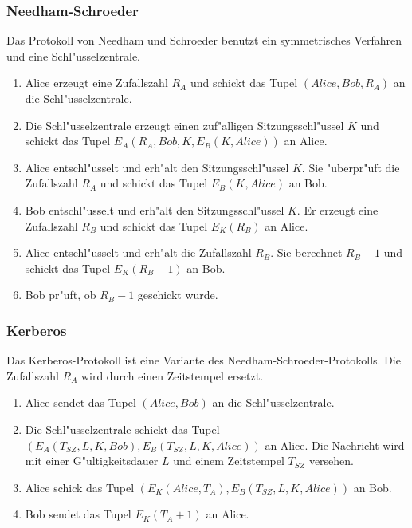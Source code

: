 
\subsubsection*{Needham-Schroeder}

Das Protokoll von Needham und Schroeder benutzt ein symmetrisches Verfahren
und eine Schl"usselzentrale.
\begin{enumerate}
  \item Alice erzeugt eine Zufallszahl $R_A$ und schickt das Tupel
        $(Alice,Bob,R_A)$ an die Schl"us\-sel\-zen\-trale.
  \item Die Schl"usselzentrale erzeugt einen zuf"alligen
        Sitzungsschl"ussel $K$ und schickt das Tupel
        $E_A(R_A,Bob,K,E_B(K,Alice))$ an Alice.
  \item Alice entschl"usselt und erh"alt den Sitzungsschl"ussel
        $K$. Sie "uberpr"uft die Zufallszahl $R_A$ und schickt das
        Tupel $E_B(K,Alice)$ an Bob.
  \item Bob entschl"usselt und erh"alt den Sitzungsschl"ussel $K$. Er
        erzeugt eine Zufallszahl $R_B$ und schickt das Tupel
        $E_K(R_B)$ an Alice.
  \item Alice entschl"usselt und erh"alt die Zufallszahl $R_B$. Sie
        berechnet $R_B-1$ und schickt das Tupel $E_K(R_B-1)$ an Bob.
  \item Bob pr"uft, ob $R_B-1$ geschickt wurde.
\end{enumerate}


\subsubsection*{Kerberos}

Das Kerberos-Protokoll ist eine Variante des
Needham-Schroeder-Protokolls. Die Zufallszahl $R_A$ wird durch einen
Zeitstempel ersetzt.
\begin{enumerate}
  \item Alice sendet das Tupel $(Alice,Bob)$ an die
        Schl"usselzentrale.
  \item Die Schl"usselzentrale schickt das Tupel
        $(E_A(T_{SZ},L,K,Bob),E_B(T_{SZ},L,K,Alice))$ an Alice. Die
        Nachricht wird mit einer G"ultigkeitsdauer $L$ und einem
        Zeitstempel $T_{SZ}$ versehen.
  \item Alice schick das Tupel
        $(E_K(Alice,T_A),E_B(T_{SZ},L,K,Alice))$ an Bob.
  \item Bob sendet das Tupel $E_K(T_A+1)$ an Alice.
\end{enumerate}

